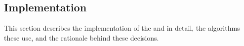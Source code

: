 \subsection{Implementation} \label{subsect:case-study:impl}

This section describes the implementation of the \mlblinkui and \mlblinkapi in detail, the algorithms these use, and the rationale behind these decisions.
